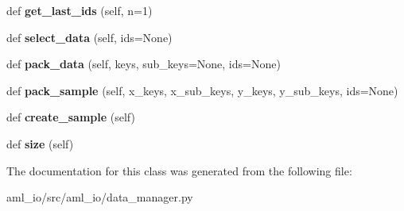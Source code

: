 \begin{DoxyCompactItemize}
def {\bfseries get\+\_\+last\+\_\+ids} (self, n=1)
\item 
\hypertarget{classaml__io_1_1data__manager_1_1_data_manager_aad58f7c69f6c06eb34675010533a8aac}{}\label{classaml__io_1_1data__manager_1_1_data_manager_aad58f7c69f6c06eb34675010533a8aac} 
def {\bfseries select\+\_\+data} (self, ids=None)
\item 
\hypertarget{classaml__io_1_1data__manager_1_1_data_manager_af0c7cf0fcd554d702cf895b33a1a2b5a}{}\label{classaml__io_1_1data__manager_1_1_data_manager_af0c7cf0fcd554d702cf895b33a1a2b5a} 
def {\bfseries pack\+\_\+data} (self, keys, sub\+\_\+keys=None, ids=None)
\item 
\hypertarget{classaml__io_1_1data__manager_1_1_data_manager_a3df42b15ac20a5178f71e420eb2a9241}{}\label{classaml__io_1_1data__manager_1_1_data_manager_a3df42b15ac20a5178f71e420eb2a9241} 
def {\bfseries pack\+\_\+sample} (self, x\+\_\+keys, x\+\_\+sub\+\_\+keys, y\+\_\+keys, y\+\_\+sub\+\_\+keys, ids=None)
\item 
\hypertarget{classaml__io_1_1data__manager_1_1_data_manager_a3cf16fc43ca8af46405c4c9addbc0b0b}{}\label{classaml__io_1_1data__manager_1_1_data_manager_a3cf16fc43ca8af46405c4c9addbc0b0b} 
def {\bfseries create\+\_\+sample} (self)
\item 
\hypertarget{classaml__io_1_1data__manager_1_1_data_manager_a1a4f99ae3887cb1076b39bc747ed3b4d}{}\label{classaml__io_1_1data__manager_1_1_data_manager_a1a4f99ae3887cb1076b39bc747ed3b4d} 
def {\bfseries size} (self)
\end{DoxyCompactItemize}


The documentation for this class was generated from the following file\+:\begin{DoxyCompactItemize}
\item 
aml\+\_\+io/src/aml\+\_\+io/data\+\_\+manager.\+py\end{DoxyCompactItemize}
